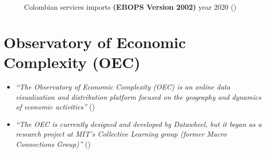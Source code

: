 \documentclass[
  ignorenonframetext,
]{beamer}
\begin{document}
\begin{frame}{}
\label{section-14}
\begin{figure}


\caption{\label{fig-colombian-services-imports-2020}Colombian services
imports \textbf{(EBOPS Version 2002)} year 2020
()}

\end{figure}%
\end{frame}

\section{Observatory of Economic Complexity
(OEC)}\label{observatory-of-economic-complexity-oec}

\begin{frame}{}
\label{section-15}
\begin{itemize}
\item
  \emph{``The Observatory of Economic Complexity (OEC) is an online data
  visualization and distribution platform focused on the geography and
  dynamics of economic activities''}
  ()
\item
  \emph{``The OEC is currently designed and developed by Datawheel, but
  it began as a research project at MIT's Collective Learning group
  (former Macro Connections Group)''}
  ()
\end{itemize}
\end{frame}
\end{document}
